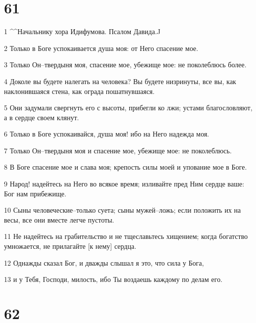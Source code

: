 \chapter{61}

\par 1 ^^Начальнику хора Идифумова. Псалом Давида.^^
\par 2 Только в Боге успокаивается душа моя: от Него спасение мое.
\par 3 Только Он--твердыня моя, спасение мое, убежище мое: не поколеблюсь более.
\par 4 Доколе вы будете налегать на человека? Вы будете низринуты, все вы, как наклонившаяся стена, как ограда пошатнувшаяся.
\par 5 Они задумали свергнуть его с высоты, прибегли ко лжи; устами благословляют, а в сердце своем клянут.
\par 6 Только в Боге успокаивайся, душа моя! ибо на Него надежда моя.
\par 7 Только Он--твердыня моя и спасение мое, убежище мое: не поколеблюсь.
\par 8 В Боге спасение мое и слава моя; крепость силы моей и упование мое в Боге.
\par 9 Народ! надейтесь на Него во всякое время; изливайте пред Ним сердце ваше: Бог нам прибежище.
\par 10 Сыны человеческие--только суета; сыны мужей--ложь; если положить их на весы, все они вместе легче пустоты.
\par 11 Не надейтесь на грабительство и не тщеславьтесь хищением; когда богатство умножается, не прилагайте [к нему] сердца.
\par 12 Однажды сказал Бог, и дважды слышал я это, что сила у Бога,
\par 13 и у Тебя, Господи, милость, ибо Ты воздаешь каждому по делам его.

\chapter{62}

